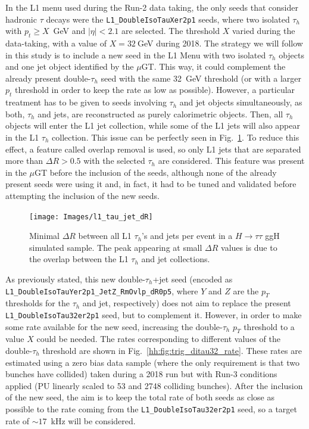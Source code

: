 \documentclass[../main.tex]{subfiles}
\begin{document}
In the L1 menu used during the Run-2 data taking, the only seeds that consider hadronic $\tau$ decays were the \texttt{L1\_DoubleIsoTauXer2p1} seeds, where two isolated $\tau_h$ with $p_t\geq X$~GeV and $|\eta|<2.1$ are selected. The threshold $X$ varied during the data-taking, with a value of $X=32~$GeV during 2018. The strategy we will follow in this study is to include a new seed in the L1 Menu with two isolated $\tau_h$ objects and one jet object identified by the $\mu$GT. This way, it could complement the already present double-$\tau_h$ seed with the same 32~GeV threshold (or with a larger $p_t$ threshold in order to keep the rate as low as possible). However, a particular treatment has to be given to seeds involving $\tau_h$ and jet objects simultaneously, as both, $\tau_h$ and jets, are reconstructed as purely calorimetric objects. Then, all $\tau_h$ objects will enter the L1 jet collection, while some of the L1 jets will also appear in the L1 $\tau_h$ collection. This issue can be perfectly seen in Fig.~\ref{hh:fig:l1_tau_jet_dR}. To reduce this effect, a feature called overlap removal \cite{intro:l1_13tev} is used, so only L1 jets that are separated more than $\Delta R>0.5$ with the selected $\tau_h$ are considered. This feature was present in the $\mu$GT before the inclusion of the seeds, although none of the already present seeds were using it and, in fact, it had to be tuned and validated before attempting the inclusion of the new seeds.

\begin{figure}[h!]
\begin{center}
\texttt{[image: Images/l1\_tau\_jet\_dR]}
\end{center}
\caption{Minimal $\Delta R$ between all L1 $\tau_h$'s and jets per event in a $H\to\tau\tau$ ggH simulated sample. The peak appearing at small $\Delta R$ values is due to the overlap between the L1 $\tau_h$ and jet collections.}
\label{hh:fig:l1_tau_jet_dR}
\end{figure}

As previously stated, this new double-$\tau_h$+jet seed (encoded as \texttt{L1\_Double\-IsoTauY\-er2p1\-\_JetZ\_RmOvlp\_dR0p5}, where $Y$ and $Z$ are the $p_T$ thresholds for the $\tau_h$ and jet, respectively) does not aim to replace the present \texttt{L1\_Double\-Iso\-Tau32er2p1} seed, but to complement it. However, in order to make some rate available for the new seed, increasing the double-$\tau_h$ $p_T$ threshold to a value $X$ could be needed. The rates corresponding to different values of the double-$\tau_h$ threshold are shown in Fig.~\ref{hh:fig:trig_ditau32_rate}. These rates are estimated using a zero bias data sample (where the only requirement is that two bunches have collided) taken during a 2018 run but with Run-3 conditions applied (PU linearly scaled to 53 and 2748 colliding bunches). After the inclusion of the new seed, the aim is to keep the total rate of both seeds as close as possible to the rate coming from the \texttt{L1\_Double\-Iso\-Tau32er2p1} seed, so a target rate of $\sim17$~kHz will be considered.
\end{document}
